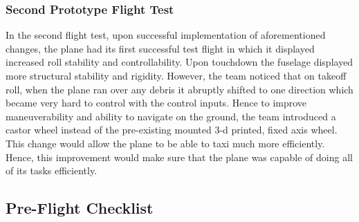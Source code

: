 \documentclass[10pt, letterpaper]{article}
\newcommand{\Filler}{}
\begin{document}
\subsubsection{Second Prototype Flight Test}
In the second flight test, upon successful implementation of aforementioned changes, the plane had its first successful test flight in which it displayed increased roll stability and controllability. Upon touchdown the fuselage displayed more structural stability and rigidity. However, the team noticed that  on takeoff roll, when the plane ran over any debris it abruptly shifted to one direction which became very hard to control with the control inputs. Hence to improve maneuverability and ability to navigate on the ground, the team introduced a castor wheel instead of the pre-existing mounted 3-d printed, fixed axis wheel. This change would allow the plane to be able to taxi much more efficiently. Hence, this improvement would make sure that the plane was capable of doing all of its tasks efficiently.

\Filler

\subsection{Pre-Flight Checklist}
\end{document}
